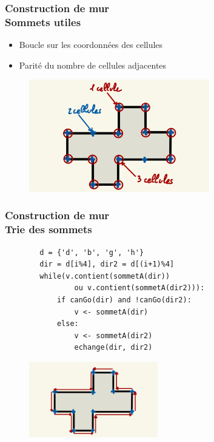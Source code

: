 \documentclass{beamer}
\begin{document}
\begin{frame}
    \frametitle{Construction de mur \\
                \small Sommets utiles}
    \begin{block}{}
        \begin{itemize}
            \item Boucle sur les coordonnées des cellules
            \item Parité du nombre de cellules adjacentes
        \end{itemize}
    \end{block}
    \begin{figure}
        \centering
        \includegraphics[width=0.7\textwidth]{images/sommets_utiles.jpg}
    \end{figure}
\end{frame}

\begin{frame}[fragile]
    \frametitle{Construction de mur \\
                \small Trie des sommets}
    \vspace*{-0.5cm}
    \begin{minipage}[t][4cm][t]{\textwidth}
        \small\begin{lstlisting}
        d = {'d', 'b', 'g', 'h'}
        dir = d[i%4], dir2 = d[(i+1)%4]
        while(v.contient(sommetA(dir)) 
                ou v.contient(sommetA(dir2))):
            if canGo(dir) and !canGo(dir2):
                v <- sommetA(dir)
            else:
                v <- sommetA(dir2)
                echange(dir, dir2)
        \end{lstlisting}
    \end{minipage}
    \begin{figure}
        \centering
        \includegraphics[width=0.5\textwidth]{images/tri_sommet.jpg}
    \end{figure}
\end{frame}
\end{document}
